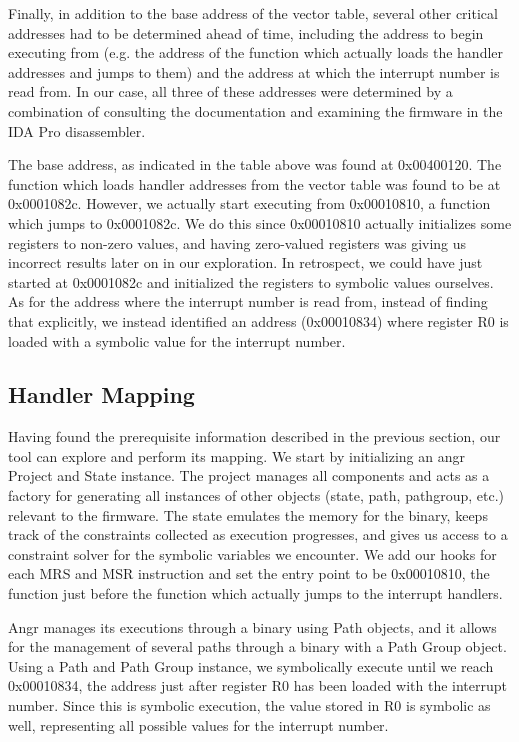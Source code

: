 \documentclass[letterpaper, 11 pt, conference]{ieeeconf}
\begin{document}
Finally, in addition to the base address of the vector table, several other critical addresses had to be determined ahead of time, including the address to begin executing from (e.g. the address of the function which actually loads the handler addresses and jumps to them) and the address at which the interrupt number is read from. In our case, all three of these addresses were determined by a combination of consulting the documentation and examining the firmware in the IDA Pro disassembler.

The base address, as indicated in the table above was found at 0x00400120. The function which loads handler addresses from the vector table was found to be at 0x0001082c. However, we actually start executing from 0x00010810, a function which jumps to 0x0001082c. We do this since 0x00010810 actually initializes some registers to non-zero values, and having zero-valued registers was giving us incorrect results later on in our exploration. In retrospect, we could have just started at 0x0001082c and initialized the registers to symbolic values ourselves. As for the address where the interrupt number is read from, instead of finding that explicitly, we instead identified an address (0x00010834) where register R0 is loaded with a symbolic value for the interrupt number.

\subsection{Handler Mapping} \label{mapping}
Having found the prerequisite information described in the previous section, our tool can explore and perform its mapping. We start by initializing an angr Project and State instance. The project manages all components and acts as a factory for generating all instances of other objects (state, path, pathgroup, etc.) relevant to the firmware. The state emulates the memory for the binary, keeps track of the constraints collected as execution progresses, and gives us access to a constraint solver for the symbolic variables we encounter. We add our hooks for each MRS and MSR instruction and set the entry point to be 0x00010810, the function just before the function which actually jumps to the interrupt handlers.

Angr manages its executions through a binary using Path objects, and it allows for the management of several paths through a binary with a Path Group object. Using a Path and Path Group instance, we symbolically execute until we reach 0x00010834, the address just after register R0 has been loaded with the interrupt number. Since this is symbolic execution, the value stored in R0 is symbolic as well, representing all possible values for the interrupt number. 
\end{document}

